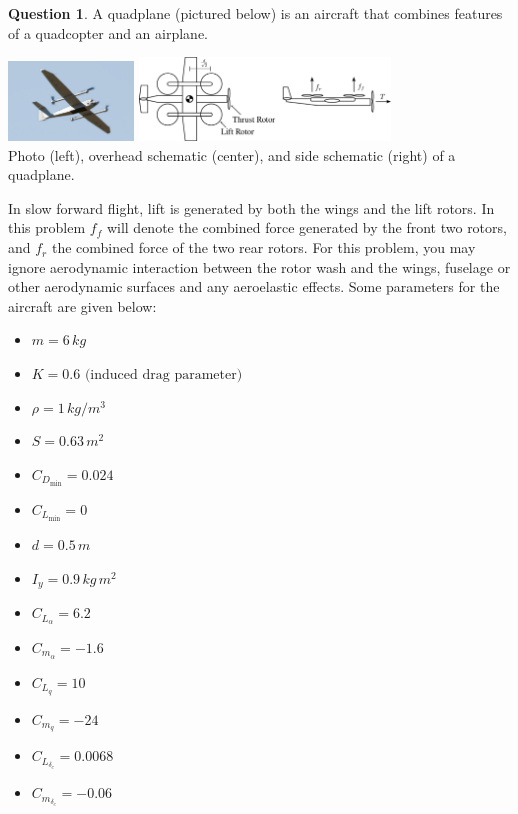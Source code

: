 \documentclass{article}
\theoremstyle{definition}
\newtheorem{question}{Question}
\begin{document}
\begin{question}
    A quadplane (pictured below) is an aircraft that combines features of a quadcopter and an airplane. 
\begin{center}
    \includegraphics[width=0.25\textwidth]{figures/real-quadplane.png}
    \hspace{1cm}
    \includegraphics[width=0.5\textwidth]{figures/quadplane.pdf}\\
    Photo (left), overhead schematic (center), and side schematic (right) of a quadplane.
\end{center}

In slow forward flight, lift is generated by both the wings and the lift rotors. In this problem $f_f$ will denote the combined force generated by the front two rotors, and $f_r$ the combined force of the two rear rotors. For this problem, you may ignore aerodynamic interaction between the rotor wash and the wings, fuselage or other aerodynamic surfaces and any aeroelastic effects.
Some parameters for the aircraft are given below:
\begin{multicols}{3}
\begin{itemize}[nosep,label={}]
    \item $m = 6 \,kg$
    \item $K = 0.6 \text{ (induced drag parameter)}$
    \item $\rho = 1 \,kg/m^3$
    \item $S = 0.63 \,m^2$
    \item $C_{D_\text{min}} = 0.024$
    \item $C_{L_\text{min}} = 0$
    \item $d = 0.5\, m$
    \item $I_y = 0.9\, kg\, m^2$
    \item $C_{L_\alpha} = 6.2$
    \item $C_{m_\alpha} = -1.6$
    \item $C_{L_q} = 10$
    \item $C_{m_q} = -24$
    \item $C_{L_{\delta_e}} = 0.0068$
    \item $C_{m_{\delta_e}} = -0.06$
\end{itemize}
\end{multicols}


\end{question}
\end{document}
